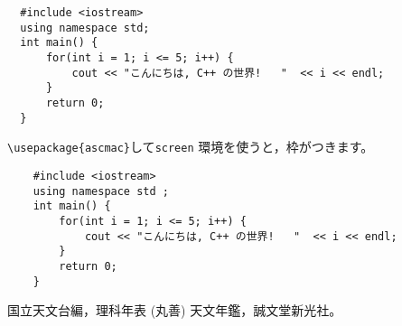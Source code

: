 \documentclass[a4paper, 12pt]{jsreport}
\begin{document}
  \begin{verbatim}
  #include <iostream>
  using namespace std;
  int main() {
      for(int i = 1; i <= 5; i++) {
          cout << "こんにちは, C++ の世界!   "  << i << endl;
      }
      return 0;
  }
  \end{verbatim}
  \verb|\usepackage{ascmac}|して\verb|screen| 環境を使うと，枠がつきます。
  \begin{screen}
    \begin{verbatim}
    #include <iostream>
    using namespace std ;
    int main() {
        for(int i = 1; i <= 5; i++) {
            cout << "こんにちは, C++ の世界!   "  << i << endl;
        }
        return 0;
    }
    \end{verbatim}
  \end{screen}

  \begin{thebibliography}{99}
     国立天文台編，理科年表 (丸善)  天文年鑑，誠文堂新光社。
  \end{thebibliography}
\end{document}
